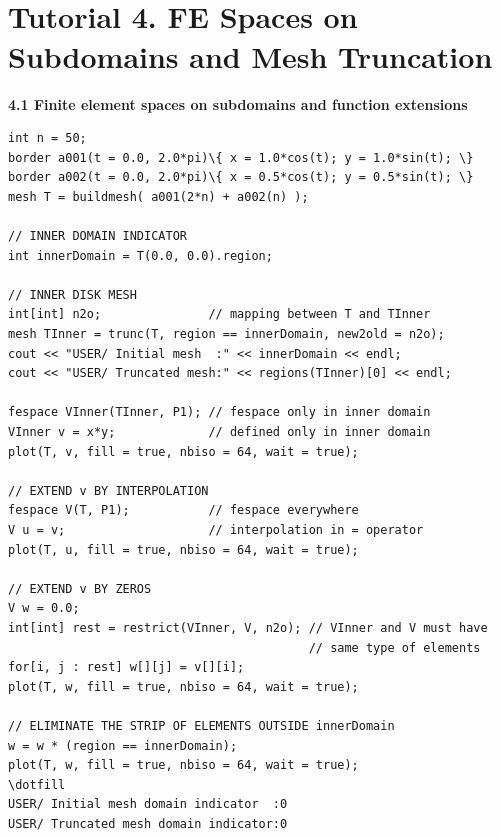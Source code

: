 \documentclass[9pt]{amsart}
\theoremstyle{remark}
\theoremstyle{definition}
\begin{document}
\section{\hrulefill\\Tutorial 4. FE Spaces on Subdomains and Mesh Truncation}
%
\vspace*{0.2cm}
\textbf{4.1 Finite element spaces on subdomains and function extensions}
\begin{Verbatim}[commandchars=\\\{\}]
int n = 50;
border a001(t = 0.0, 2.0*pi)\{ x = 1.0*cos(t); y = 1.0*sin(t); \}
border a002(t = 0.0, 2.0*pi)\{ x = 0.5*cos(t); y = 0.5*sin(t); \}
mesh T = buildmesh( a001(2*n) + a002(n) );

// INNER DOMAIN INDICATOR
int innerDomain = T(0.0, 0.0).region;

// INNER DISK MESH
int[int] n2o;               // mapping between T and TInner
mesh TInner = trunc(T, region == innerDomain, new2old = n2o);
cout << "USER/ Initial mesh  :" << innerDomain << endl;
cout << "USER/ Truncated mesh:" << regions(TInner)[0] << endl;

fespace VInner(TInner, P1); // fespace only in inner domain
VInner v = x*y;             // defined only in inner domain
plot(T, v, fill = true, nbiso = 64, wait = true);

// EXTEND v BY INTERPOLATION
fespace V(T, P1);           // fespace everywhere
V u = v;                    // interpolation in = operator
plot(T, u, fill = true, nbiso = 64, wait = true);

// EXTEND v BY ZEROS
V w = 0.0;
int[int] rest = restrict(VInner, V, n2o); // VInner and V must have
                                          // same type of elements
for[i, j : rest] w[][j] = v[][i];
plot(T, w, fill = true, nbiso = 64, wait = true);

// ELIMINATE THE STRIP OF ELEMENTS OUTSIDE innerDomain
w = w * (region == innerDomain);
plot(T, w, fill = true, nbiso = 64, wait = true);
\dotfill
USER/ Initial mesh domain indicator  :0
USER/ Truncated mesh domain indicator:0


\end{Verbatim}
\end{document}
